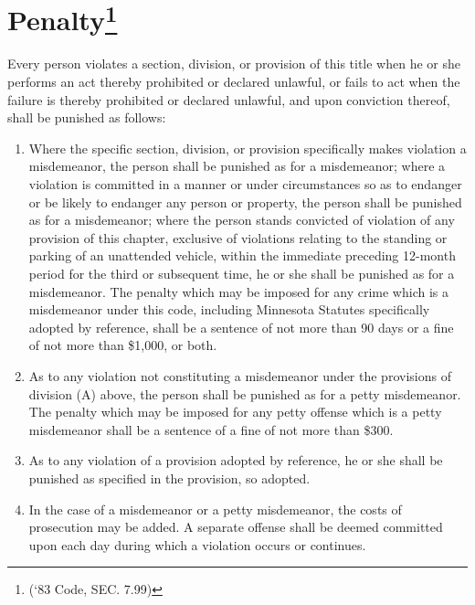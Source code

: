 \section{Penalty\footnote{(‘83 Code, SEC. 7.99)}}
Every person violates a section, division, or provision of this title when he or she performs an act thereby prohibited or declared unlawful, or fails to act when the failure is thereby prohibited or declared unlawful, and upon conviction thereof, shall be punished as follows:
\begin{enumerate}[{\indent}A)]
    \item Where the specific section, division, or provision specifically makes violation a misdemeanor, the person shall be punished as for a misdemeanor; where a violation is committed in a manner or under circumstances so as to endanger or be likely to endanger any person or property, the person shall be punished as for a misdemeanor; where the person stands convicted of violation of any provision of this chapter, exclusive of violations relating to the standing or parking of an unattended vehicle, within the immediate preceding 12-month period for the third or subsequent time, he or she shall be punished as for a misdemeanor.  The penalty which may be imposed for any crime which is a misdemeanor under this code, including Minnesota Statutes specifically adopted by reference, shall be a sentence of not more than 90 days or a fine of not more than \$1,000, or both.
    \item As to any violation not constituting a misdemeanor under the provisions of division (A) above,  the person shall be punished as for a petty misdemeanor.  The penalty which may be imposed for any petty offense which is a petty misdemeanor shall be a sentence of a fine of not more than \$300.
    \item As to any violation of a provision adopted by reference, he or she shall be punished as specified in the provision, so adopted.
    \item In the case of a misdemeanor or a petty misdemeanor, the costs of prosecution may be added.  A separate offense shall be deemed committed upon each day during which a violation occurs or continues.
\end{enumerate}
